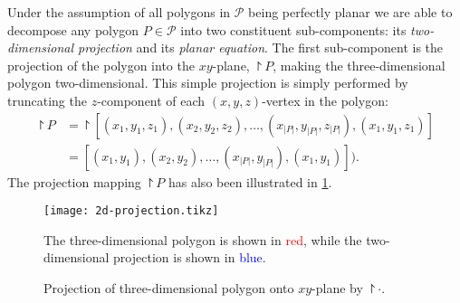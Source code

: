 Under the assumption of all polygons in $\mathcal{P}$ being perfectly planar we are able to decompose any polygon $P \in \mathcal{P}$ into two constituent sub-components: its \textit{two-dimensional projection} and its \textit{planar equation}.
The first sub-component is the projection of the polygon into the $xy$-plane, $\project{P}$, making the three-dimensional polygon two-dimensional.
This simple projection is simply performed by truncating the $z$-component of each $(x, y, z)$-vertex in the polygon:
\begin{align}
  \project{P}
  &=
  \project{[(x_1, y_1, z_1), (x_2, y_2, z_2), \dots, (x_{|P|}, y_{|P|}, z_{|P|}), (x_1, y_1, z_1)]}
  \nonumber\\
  &=
  [(x_1, y_1), (x_2, y_2), \dots, (x_{|P|}, y_{|P|}), (x_1, y_1)]).
  \tag{Projection mapping}\label{eq:project}
\end{align}
The projection mapping $\project{P}$ has also been illustrated in \cref{fig:2d-polygon-projection}.
\begin{figure}
  \centering
  \texttt{[image: 2d-projection.tikz]}
  \caption{%
    Projection of three-dimensional polygon onto $xy$-plane by $\project{\cdot}$.
  }{%
    The three-dimensional polygon is shown in \textcolor{red}{red}, while the two-dimensional projection is shown in \textcolor{blue}{blue}.
  }%
  \label{fig:2d-polygon-projection}
\end{figure}

